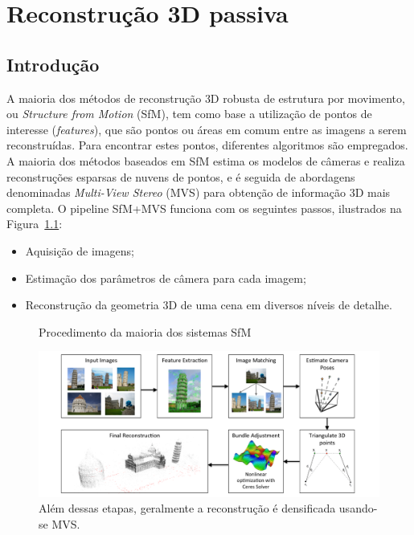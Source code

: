 \doublespacing
\chapter{Reconstrução 3D passiva}\label{cap:pontosdeinteresse}
\doublespacing
\section{Introdução}

A maioria dos métodos de reconstrução 3D robusta de estrutura por movimento, ou \emph{Structure
from Motion} (SfM), tem como base a utilização de pontos de interesse
(\emph{features}), que são pontos ou áreas em comum entre as imagens a serem
reconstruídas. Para encontrar estes pontos, diferentes algoritmos são empregados. 
A maioria dos métodos baseados em SfM estima os modelos de câmeras e
realiza reconstruções esparsas de nuvens de pontos, e é seguida de abordagens denominadas
\emph{Multi-View Stereo} (MVS) para obtenção de informação 3D mais completa.  O
pipeline SfM+MVS funciona com os seguintes passos, ilustrados na Figura~\ref{fig:sfmpipeline}:

\begin{itemize}
\item{Aquisição de imagens;}
\item{Estimação dos parâmetros de câmera para cada imagem;}
\item{Reconstrução da geometria 3D de uma cena em diversos níveis de detalhe.}
\end{itemize}

\begin{figure}[!h]
	\centering
	\caption{Procedimento da maioria dos sistemas SfM}
	\includegraphics[width=\linewidth]{figs/pipelinesfm.png}
	\caption{%
	Além dessas etapas, geralmente a reconstrução é densificada usando-se MVS.
	}
   \label{fig:sfmpipeline}
\end{figure}

